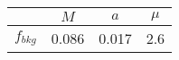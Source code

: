 \begin{tabular}{c||c|c|c}
 & $M$ & $a$ & $\mu$  \\
\hline
$f_{bkg}$  & 0.086 & 0.017 & 2.6\\
\end{tabular}
